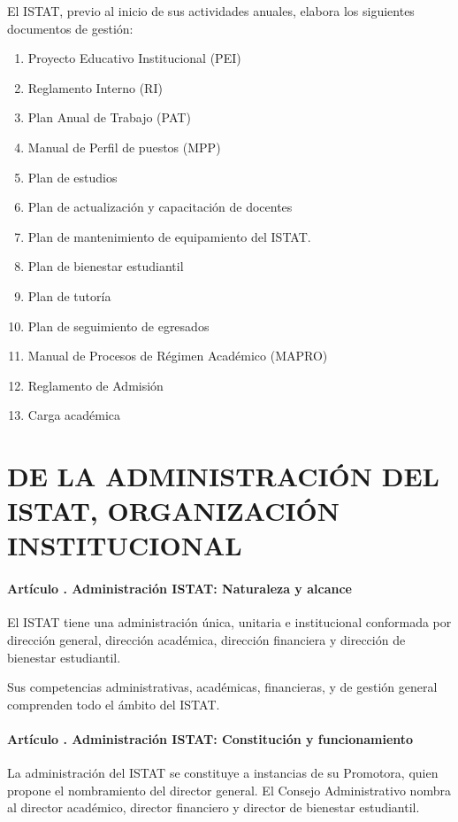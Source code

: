 El ISTAT, previo al inicio de sus actividades anuales, elabora los siguientes documentos de gestión: 
\begin{enumerate}
\item Proyecto Educativo Institucional (PEI) 
\item Reglamento Interno (RI) 
\item Plan Anual de Trabajo (PAT) 
\item Manual de Perfil de puestos (MPP) 
\item Plan de estudios 
\item Plan de actualización y capacitación de docentes 
\item Plan de mantenimiento de equipamiento del ISTAT. 
\item Plan de bienestar estudiantil 
\item Plan de tutoría  
\item Plan de seguimiento de egresados 
\item Manual de Procesos de Régimen Académico (MAPRO) 
\item Reglamento de Admisión 
\item Carga académica
\end{enumerate}
\part{DE LA ADMINISTRACIÓN DEL ISTAT, ORGANIZACIÓN INSTITUCIONAL}
\subsection{Artículo . Administración ISTAT: Naturaleza y alcance}
\addtocounter{ns}{1}
El ISTAT tiene una administración única, unitaria e institucional conformada por dirección general, dirección académica, dirección financiera y dirección de bienestar estudiantil. 
 
Sus competencias administrativas, académicas, financieras, y de gestión general comprenden todo el ámbito del ISTAT.  
\subsection{Artículo . Administración ISTAT: Constitución y funcionamiento}
\addtocounter{ns}{1}
La administración del ISTAT se constituye a instancias de su Promotora, quien propone el nombramiento del director general. El Consejo Administrativo nombra al director académico, director financiero y director de bienestar estudiantil. 
